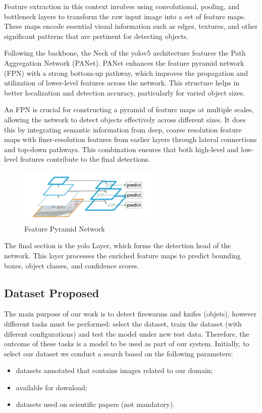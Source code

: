 Feature extraction in this context involves using convolutional, pooling, and bottleneck layers to 
transform the raw input image into a set of feature maps. These maps encode essential visual information 
such as edges, textures, and other significant patterns that are pertinent for detecting objects.

Following the backbone, the Neck of the \ac{yolo}v5 architecture features the Path Aggregation Network (PANet). PANet 
enhances the feature pyramid network (FPN) with a strong bottom-up pathway, which improves the propagation and 
utilization of lower-level features across the network. This structure helps in better localization and detection 
accuracy, particularly for varied object sizes.

An FPN is crucial for constructing a pyramid of feature maps at multiple scales, allowing the network to detect 
objects effectively across different sizes. It does this by integrating semantic information from deep, coarse 
resolution feature maps with finer-resolution features from earlier layers through lateral connections and top-down 
pathways. This combination ensures that both high-level and low-level features contribute to the final detections.

\begin{figure}[h]
    \centering 
    \includegraphics[width=0.6\textwidth]{figs/fpn.png} 
    \caption{Feature Pyramid Network}
    \label{fig:fpn}
\end{figure}

The final section is the \ac{yolo} Layer, which forms the detection head of the network. This layer processes the 
enriched feature maps to predict bounding boxes, object classes, and confidence scores.

\subsection{Dataset Proposed} 
The main purpose of our work is to detect firewarms and knifes (objets), however different tasks must be performed: 
select the dataset, train the dataset (with diferent configurations) and test the model under new test data. Therefore, 
the outcome of these tasks is a model to be used as part of our system.
Initially, to select our dataset we conduct a search based on the following parameters:
\begin{itemize}
    \item datasets annotated that contains images related to our domain;
    \item available for download;
    \item datasets used on scientific papers (not mandatory).
\end{itemize}

